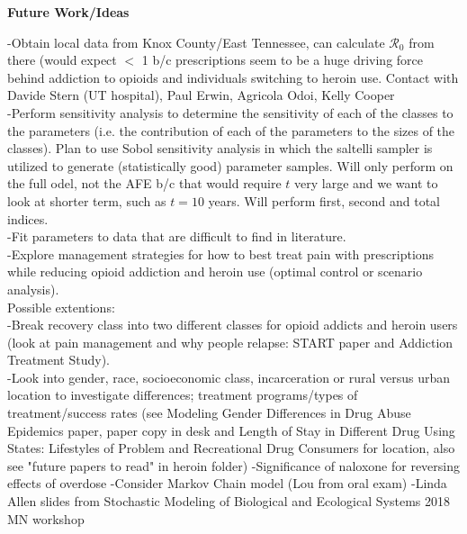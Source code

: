 \documentclass[12pt]{article}
\begin{document}

\textbf{Future Work/Ideas} 


-Obtain local data from Knox County/East Tennessee, can calculate $\mathscr{R}_0$ from there (would expect $<$ 1 b/c prescriptions seem to be a huge driving force behind addiction to opioids and individuals switching to heroin use. Contact with Davide Stern (UT hospital), Paul Erwin, Agricola Odoi, Kelly Cooper\\
-Perform sensitivity analysis to determine the sensitivity of each of the classes to the parameters (i.e. the contribution of each of the parameters to the sizes of the classes). Plan to use Sobol sensitivity analysis in which the saltelli sampler is utilized to generate (statistically good) parameter samples. Will only perform on the full  odel, not the AFE b/c that would require $t$ very large and we want to look at shorter term, such as $t=10$ years. Will perform first, second and total indices. \\
-Fit parameters to data that are difficult to find in literature. \\
-Explore management strategies for how to best treat pain with prescriptions while reducing opioid addiction and heroin use (optimal control or scenario analysis).  \\
Possible extentions: \\
-Break recovery class into two different classes for opioid addicts and heroin users (look at pain management and why people relapse: START paper and Addiction Treatment Study). \\
-Look into gender, race, socioeconomic class, incarceration or rural versus urban location to investigate differences; treatment programs/types of treatment/success rates (see Modeling Gender Differences in Drug Abuse Epidemics paper, paper copy in desk and Length of Stay in Different Drug Using States: Lifestyles of Problem and Recreational Drug Consumers for location, also see "future papers to read" in heroin folder)%
-Significance of naloxone for reversing effects of overdose 
-Consider Markov Chain model (Lou from oral exam) 
-Linda Allen slides from Stochastic Modeling of Biological and Ecological Systems 2018 MN workshop 


\pagebreak




 
\end{document}
